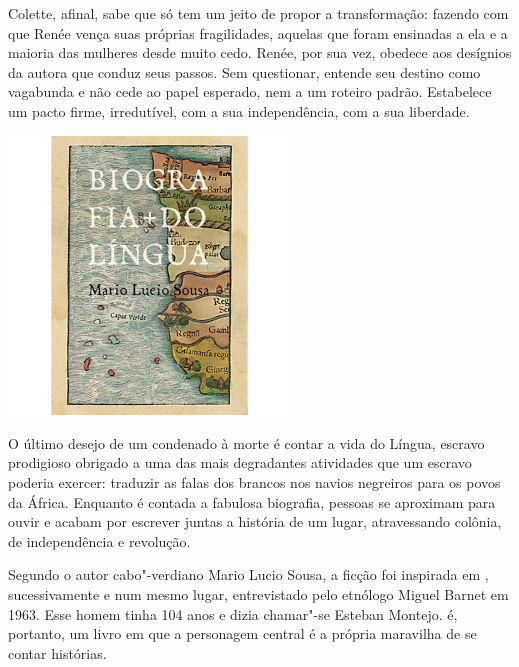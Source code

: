 \begin{multicols}{2}
Colette, afinal, sabe que só tem um jeito de propor a transformação: fazendo com que Renée vença suas próprias fragilidades, aquelas que foram ensinadas a ela e a maioria das mulheres desde muito cedo. Renée, por sua vez, obedece aos desígnios da autora que conduz seus passos. Sem questionar, entende seu destino como vagabunda e não cede ao papel esperado, nem a um roteiro padrão. Estabelece um pacto firme, irredutível, com a sua independência, com a sua liberdade.

\bigskip

\noindent{}\textcolor{gray}{\footnotesize{}}
\end{multicols}


\pagebreak %


\begin{center}
\hspace*{.5cm}\includegraphics[width=74mm]{./grid/lingua.jpg}
\end{center}

\hspace*{-7cm}\hrulefill\hspace*{-7cm}

\medskip

\noindent{}O último desejo de um condenado à morte é contar a vida do Língua, escravo prodigioso obrigado a uma das mais degradantes atividades que um escravo poderia exercer: traduzir as falas dos brancos nos navios negreiros para os povos da África. Enquanto é contada a fabulosa biografia, pessoas se aproximam para ouvir e acabam por escrever juntas a história de um lugar, atravessando colônia, de independência e revolução.

Segundo o autor cabo"-verdiano Mario Lucio Sousa, a ficção foi inspirada em , sucessivamente e num mesmo lugar, entrevistado pelo etnólogo Miguel Barnet em 1963. Esse homem tinha 104 anos e dizia chamar"-se Esteban Montejo. {} é, portanto, um livro em que a personagem central é a própria maravilha de se contar histórias.

